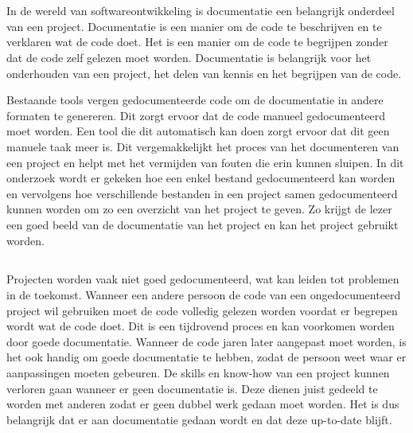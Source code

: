 
\chapter{}%
\label{ch:inleiding}

In de wereld van softwareontwikkeling is documentatie een belangrijk onderdeel van een project.
Documentatie is een manier om de code te beschrijven en te verklaren wat de code doet.
Het is een manier om de code te begrijpen zonder dat de code zelf gelezen moet worden.
Documentatie is belangrijk voor het onderhouden van een project, het delen van kennis en het begrijpen van de code.

Bestaande tools vergen gedocumenteerde code om de documentatie in andere formaten te genereren.
Dit zorgt ervoor dat de code manueel gedocumenteerd moet worden.
Een tool die dit automatisch kan doen zorgt ervoor dat dit geen manuele taak meer is.
Dit vergemakkelijkt het proces van het documenteren van een project en helpt met het vermijden van fouten die erin kunnen sluipen. 
In dit onderzoek wordt er gekeken hoe een enkel bestand gedocumenteerd kan worden en vervolgens hoe verschillende bestanden in een project samen gedocumenteerd kunnen worden om zo een overzicht van het project te geven.
Zo krijgt de lezer een goed beeld van de documentatie van het project en kan het project gebruikt worden.

\section{}%
\label{sec:probleemstelling}

Projecten worden vaak niet goed gedocumenteerd, wat kan leiden tot problemen in de toekomst. Wanneer een andere persoon de code van een ongedocumenteerd project wil gebruiken moet de code volledig gelezen worden voordat er begrepen wordt wat de code doet. 
Dit is een tijdrovend proces en kan voorkomen worden door goede documentatie.
Wanneer de code jaren later aangepast moet worden, is het ook handig om goede documentatie te hebben, zodat de persoon weet waar er aanpassingen moeten gebeuren.
De skills en know-how van een project kunnen verloren gaan wanneer er geen documentatie is.
Deze dienen juist gedeeld te worden met anderen zodat er geen dubbel werk gedaan moet worden.
Het is dus belangrijk dat er aan documentatie gedaan wordt en dat deze up-to-date blijft.

